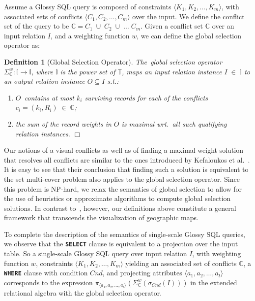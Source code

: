 \documentclass[11pt, oneside]{report}
\newtheorem{definition}{Definition}
\newcommand{\mathendbox}{\hfill$\Box$}
\begin{document}
{Assume a Glossy SQL query is composed of constraints $\langle K_1, K_2, \ldots, K_m\rangle$, with associated sets of conflicts $\langle C_1, C_2, \ldots, C_m\rangle$ over the input. We define the conflict set of the query to be $\mathbb{C} = C_1 \;\cup\; C_2 \;\cup\; \ldots \; C_m$. Given a conflict set $\mathbb{C}$ over an input relation $I$, and a weighting function $w$, we can define the global selection operator as:
 
 \begin{definition}[Global Selection Operator]
The~global selection operator $\Sigma_{\mathbb{C}}^{w}: \mathbb{I} \rightarrow \mathbb{I}$, where $\mathbb{I}$ is the power set of $\mathbb{T}$, maps an input relation instance $I \; \in \; \mathbb{I}$ to an output relation instance $O \subseteq I$ s.t.:
\begin{enumerate}[label=(\alph*)]
\item $O$~contains at most $k_{i}$ surviving records for each of the conflicts $c_{i} = (k_{i},R_{i}) \; \in \; \mathbb{C}$;
\item the sum of the record weights in $O$ is maximal wrt.~all such qualifying relation instances.  \mathendbox 
\end{enumerate}
 \end{definition} 

Our notions of a visual conflicts as well as of finding a maximal-weight solution that resolves all conflicts are similar to the ones introduced by Kefaloukos et al.~\cite{kefaloukos2014declarative}. It is easy to see that their conclusion that finding such a solution is equivalent to the set multi-cover problem also applies to the global selection operator. Since this problem is NP-hard, we relax the semantics of global selection to allow for the use of heuristics or approximate algorithms to compute global selection solutions. In contrast to~\cite{kefaloukos2014declarative}, however, our definitions above constitute a general framework that transcends the visualization of geographic maps.     

To complete the description of the semantics of single-scale Glossy SQL queries, we observe that the \textbf{\texttt{SELECT}} clause is equivalent to a projection over the input table. So a single-scale Glossy SQL query over input relation $I$, with weighting function $w$, constraints $\langle K_1, K_2, \ldots, K_m\rangle$ yielding an associated set of conflicts $\mathbb{C}$, a \textbf{\texttt{WHERE}} clause with condition $Cnd$, and projecting attributes $\langle a_1, a_2, \ldots, a_l \rangle$ corresponds to the expression $\pi_{\langle a_1, a_2, \ldots, a_l \rangle} (\Sigma_{\mathbb{C}}^{w}(\sigma_{Cnd}(I)))$ in the extended relational algebra with the global selection operator. 
 
}
\end{document}

